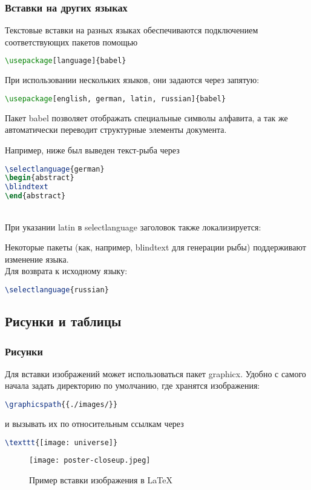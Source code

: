 \documentclass[a4paper]{article}
\newcommand{\cbox}[2][green]{%
  \colorbox{#1}{\parbox{\dimexpr\linewidth-2\fboxsep}{\strut #2\strut}}%
}
\begin{document}
\subsubsection{Вставки на других языках}
Текстовые вставки на разных языках обеспечиваются подключением соответствующих пакетов помощью 
\begin{lstlisting}[language=TeX]
\usepackage[language]{babel}
\end{lstlisting}
\thispagestyle{empty}
\newpage
При использовании нескольких языков, они задаются через запятую:
\begin{lstlisting}[language=TeX]
\usepackage[english, german, latin, russian]{babel}
\end{lstlisting}\hfill\break
Пакет babel позволяет отображать специальные символы алфавита, а так же автоматически переводит структурные элементы документа. 

Например, ниже был выведен текст-рыба через 
\begin{lstlisting}[language=TeX]
\selectlanguage{german}
\begin{abstract}
\blindtext
\end{abstract}
\end{lstlisting}
\cbox[lightgray!90]{
\begin{abstract}
\blindtext
\end{abstract}
}
 \\
При указании latin в selectlanguage заголовок также локализируется:\\
\cbox[lightgray!90]{
\begin{abstract}
\blindtext
\end{abstract}
}

Некоторые пакеты (как, например, blindtext для генерации рыбы) поддерживают изменение языка.\\
Для возврата к исходному языку: 
\begin{lstlisting}[language=TeX]
\selectlanguage{russian} 
\end{lstlisting}
\thispagestyle{empty}
\newpage
\subsection{Рисунки и таблицы}
\subsubsection{Рисунки}
Для вставки изображений может использоваться пакет graphicx.
Удобно с самого начала задать директорию по умолчанию, где хранятся изображения:
\begin{lstlisting}[language=TeX] 
\graphicspath{{./images/}} 
\end{lstlisting}
и вызывать их по относительным ссылкам через
\begin{lstlisting}[language=TeX] 
\texttt{[image: universe]}
\end{lstlisting} 
\begin{figure}[h]
    \centering
    \texttt{[image: poster-closeup.jpeg]}
    \caption{Пример вставки изображения в \LaTeX}
    \label{fig:mesh1}
\end{figure}
\end{document}
